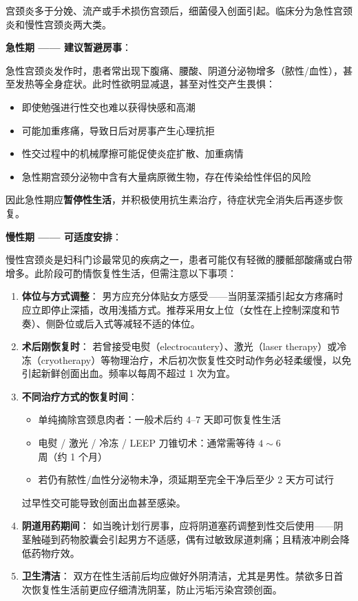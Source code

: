 \vspace{0.5em}
宫颈炎多于分娩、流产或手术损伤宫颈后，细菌侵入创面引起。临床分为急性宫颈炎和慢性宫颈炎两大类。

\vspace{0.5em}
\noindent\textbf{急性期 —— 建议暂避房事}：

急性宫颈炎发作时，患者常出现下腹痛、腰酸、阴道分泌物增多（脓性/血性），甚至发热等全身症状。此时性欲明显减退，甚至对性交产生畏惧：
\begin{itemize}
	\item 即使勉强进行性交也难以获得快感和高潮
	\item 可能加重疼痛，导致日后对房事产生心理抗拒
	\item 性交过程中的机械摩擦可能促使炎症扩散、加重病情
	\item 急性期宫颈分泌物中含有大量病原微生物，存在传染给性伴侣的风险
\end{itemize}
因此急性期应\textbf{暂停性生活}，并积极使用抗生素治疗，待症状完全消失后再逐步恢复。

\vspace{0.5em}
\noindent\textbf{慢性期 —— 可适度安排}：

慢性宫颈炎是妇科门诊最常见的疾病之一，患者可能仅有轻微的腰骶部酸痛或白带增多。此阶段可酌情恢复性生活，但需注意以下事项：

\begin{enumerate}
	\item \textbf{体位与方式调整}：
	男方应充分体贴女方感受——当阴茎深插引起女方疼痛时应立即停止深插，改用浅插方式。推荐采用女上位（女性在上控制深度和节奏）、侧卧位或后入式等减轻不适的体位。

	\item \textbf{术后刚恢复时}：
	若曾接受电熨（electrocautery）、激光（laser therapy）或冷冻（cryotherapy）等物理治疗，术后初次恢复性交时动作务必轻柔缓慢，以免引起新鲜创面出血。频率以每周不超过 1 次为宜。

	\item \textbf{不同治疗方式的恢复时间}：
	\begin{itemize}
		\item 单纯摘除宫颈息肉者：一般术后约 4--7 天即可恢复性生活
		\item 电熨 / 激光 / 冷冻 / LEEP 刀锥切术：通常需等待 $4\sim6$ 周（约 1 个月）
		\item 若仍有脓性/血性分泌物未净，须延期至完全干净后至少 2 天方可试行
	\end{itemize}
	过早性交可能导致创面出血甚至感染。

	\item \textbf{阴道用药期间}：
	如当晚计划行房事，应将阴道塞药调整到性交后使用——阴茎触碰到药物胶囊会引起男方不适感，偶有过敏致尿道刺痛；且精液冲刷会降低药物疗效。

	\item \textbf{卫生清洁}：
	双方在性生活前后均应做好外阴清洁，尤其是男性。禁欲多日首次恢复性生活前更应仔细清洗阴茎，防止污垢污染宫颈创面。
\end{enumerate}

